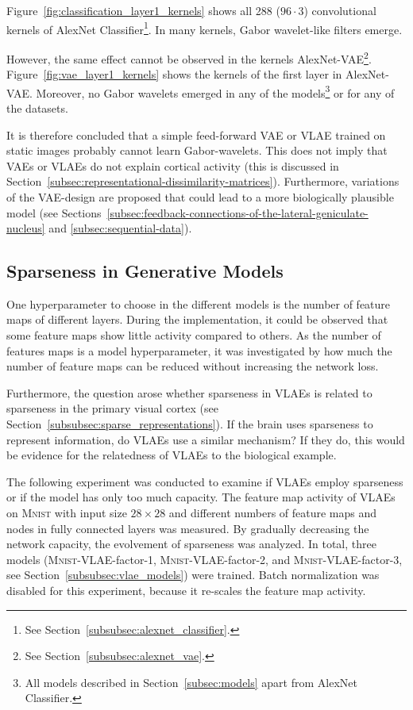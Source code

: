 Figure~\ref{fig:classification_layer1_kernels} shows all 288 ($96 \cdot 3$) convolutional kernels of AlexNet Classifier\footnote{See Section~\ref{subsubsec:alexnet_classifier}.}.
In many kernels, Gabor wavelet-like filters emerge.

However, the same effect cannot be observed in the kernels AlexNet-\ac{VAE}\footnote{See Section~\ref{subsubsec:alexnet_vae}.}.
Figure~\ref{fig:vae_layer1_kernels} shows the kernels of the first layer in AlexNet-\ac{VAE}.
Moreover, no Gabor wavelets emerged in any of the models\footnote{All models described in Section~\ref{subsec:models} apart from AlexNet Classifier.} or for any of the datasets.

It is therefore concluded that a simple feed-forward \ac{VAE} or \ac{VLAE} trained on static images probably cannot learn Gabor-wavelets.
This does not imply that \acp{VAE} or \acp{VLAE} do not explain cortical activity (this is discussed in Section~\ref{subsec:representational-dissimilarity-matrices}).
Furthermore, variations of the \ac{VAE}-design are proposed that could lead to a more biologically plausible model (see Sections~\ref{subsec:feedback-connections-of-the-lateral-geniculate-nucleus} and \ref{subsec:sequential-data}).


\subsection{Sparseness in Generative Models}\label{subsec:effective-network-capacity}
One hyperparameter to choose in the different models is the number of feature maps of different layers.
During the implementation, it could be observed that some feature maps show little activity compared to others.
As the number of features maps is a model hyperparameter, it was investigated by how much the number of feature maps can be reduced without increasing the network loss.

Furthermore, the question arose whether sparseness in \acp{VLAE} is related to sparseness in the primary visual cortex (see Section~\ref{subsubsec:sparse_representations}).
If the brain uses sparseness to represent information, do \acp{VLAE} use a similar mechanism?
If they do, this would be evidence for the relatedness of \acp{VLAE} to the biological example.

The following experiment was conducted to examine if \acp{VLAE} employ sparseness or if the model has only too much capacity.
The feature map activity of \ac{VLAE}s on \textsc{Mnist} with input size $28\times 28$ and different numbers of feature maps and nodes in fully connected layers was measured.
By gradually decreasing the network capacity, the evolvement of sparseness was analyzed.
In total, three models (\textsc{Mnist}-\ac{VLAE}-factor-1, \textsc{Mnist}-\ac{VLAE}-factor-2, and \textsc{Mnist}-\ac{VLAE}-factor-3, see Section~\ref{subsubsec:vlae_models}) were trained.
Batch normalization was disabled for this experiment, because it re-scales the feature map activity.


